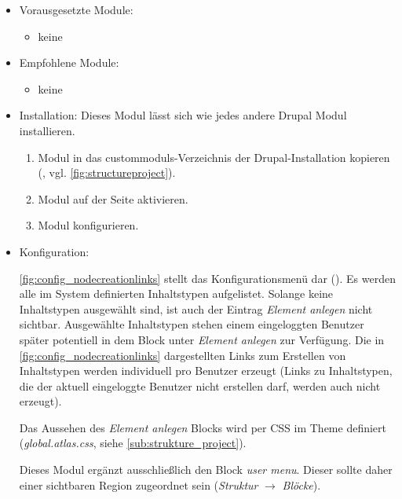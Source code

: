 \begin{itemize}[parsep=0pt, itemsep=5.0pt plus 2.0pt minus 1.0pt, leftmargin=*]
	\item Vorausgesetzte Module:
	\begin{itemize}
		\item keine
	\end{itemize}
	
	\item Empfohlene Module:
	\begin{itemize}
		\item keine
	\end{itemize}
	
	\item Installation: 
	Dieses Modul lässt sich wie jedes andere Drupal Modul installieren.
	\begin{enumerate}
		\item Modul in das \glspl{custommodul}-Verzeichnis der Drupal-Installation kopieren  (\zB {}, vgl. \cref{fig:structureproject}).
		\item Modul auf der Seite  aktivieren.
		\item Modul konfigurieren.
	\end{enumerate}
	
	\item Konfiguration:
	
	\cref{fig:config_nodecreationlinks} stellt das Konfigurationsmenü dar (). Es werden alle im System definierten Inhaltstypen aufgelistet. Solange keine Inhaltstypen ausgewählt sind, ist auch der Eintrag \textit{Element anlegen} nicht sichtbar. Ausgewählte Inhaltstypen stehen einem eingeloggten Benutzer später potentiell in dem Block unter \textit{Element anlegen} zur Verfügung. Die in \cref{fig:config_nodecreationlinks} dargestellten Links zum Erstellen von Inhaltstypen werden individuell pro Benutzer erzeugt (Links zu Inhaltstypen, die der aktuell eingeloggte Benutzer nicht erstellen darf, werden auch nicht erzeugt). 
	
	Das Aussehen des \textit{Element anlegen} Blocks wird per CSS im Theme definiert (\zB \textit{global.atlas.css}, siehe \cref{sub:strukture_project}).
	
	Dieses Modul ergänzt ausschließlich den Block \textit{user menu}. Dieser sollte daher einer sichtbaren Region zugeordnet sein (\textit{Struktur} $\rightarrow$ \textit{Blöcke}).
	
\end{itemize}




